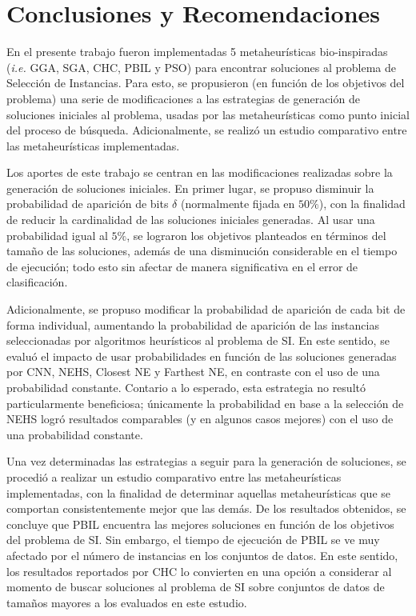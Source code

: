 \chapter*{Conclusiones y Recomendaciones}
\label{conclusiones}

En el presente trabajo fueron implementadas 5 metaheurísticas bio-inspiradas (\emph{i.e.} GGA, SGA, CHC, PBIL y PSO) para encontrar soluciones al problema de Selección de Instancias. Para esto, se propusieron (en función de los objetivos del problema) una serie de modificaciones a las estrategias de generación de soluciones iniciales al problema, usadas por las metaheurísticas como punto inicial del proceso de búsqueda. Adicionalmente, se realizó un estudio comparativo entre las metaheurísticas implementadas.%

Los aportes de este trabajo se centran en las modificaciones realizadas sobre la generación de soluciones iniciales. En primer lugar, se propuso disminuir la probabilidad de aparición de bits $\delta$ (normalmente fijada en $50\%$), con la finalidad de reducir la cardinalidad de las soluciones iniciales generadas. Al usar una probabilidad igual al $5\%$, se lograron los objetivos planteados en términos del tamaño de las soluciones, además de una disminución considerable en el tiempo de ejecución; todo esto sin afectar de manera significativa en el error de clasificación.

Adicionalmente, se propuso modificar la probabilidad de aparición de cada bit de forma individual, aumentando la probabilidad de aparición de las instancias seleccionadas por algoritmos heurísticos al problema de SI. En este sentido, se evaluó el impacto de usar probabilidades en función de las soluciones generadas por CNN, NEHS, Closest NE y Farthest NE, en contraste con el uso de una probabilidad constante. Contario a lo esperado, esta estrategia no resultó particularmente beneficiosa; únicamente la probabilidad en base a la selección de NEHS logró resultados comparables (y en algunos casos mejores) con el uso de una probabilidad constante.

Una vez determinadas las estrategias a seguir para la generación de soluciones, se procedió a realizar un estudio comparativo entre las metaheurísticas implementadas, con la finalidad de determinar aquellas metaheurísticas que se comportan consistentemente mejor que las demás. De los resultados obtenidos, se concluye que PBIL encuentra las mejores soluciones en función de los objetivos del problema de SI. Sin embargo, el tiempo de ejecución de PBIL se ve muy afectado por el número de instancias en los conjuntos de datos. En este sentido, los resultados reportados por CHC lo convierten en una opción a considerar al momento de buscar soluciones al problema de SI sobre conjuntos de datos de tamaños mayores a los evaluados en este estudio.

